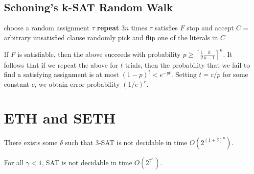 \subsection{Schoning's k-SAT Random Walk}

\begin{codebox}
    \li choose a random assignment $\tau$
    \li \textbf{repeat} $3n$ times \Do
        \li \If $\tau$ satisfies $F$ \Then
            \li stop and accept
        \li \Else
            \li $C = $ arbitrary unsatisfied clause
            \li randomly pick and flip one of the literals in $C$
        \End
    \End
\end{codebox}

\begin{theorem}
    If $F$ is satisfiable, then the above succeeds with probability $p \geq [\frac{1}{2} \frac{k}{k-1} ]^n$. It follows that if we repeat the above for $t$ trials, then the probability that we fail to find a satisfying assignment is at most $(1-p)^t < e^{-pt}$. Setting $t = c/p$ for some constant $c$, we obtain error probability $(1/e)^c$.
\end{theorem}

\section{ETH and SETH}

\begin{conjecture}
    There exists some $\delta$ such that 3-SAT is not decidable in time $O(2^{(1+\delta)^n})$.
\end{conjecture}

\begin{conjecture}
    For all $\gamma < 1$, SAT is not decidable in time $O(2^{\gamma^n})$.
\end{conjecture}

